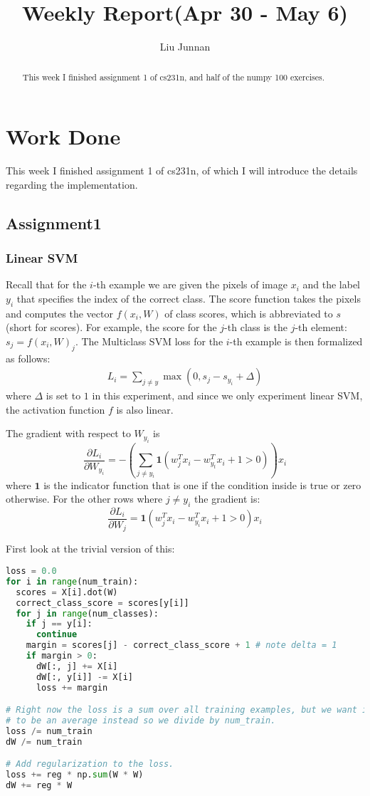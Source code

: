 \documentclass{article} %
\title{Weekly Report(Apr 30 - May 6)}
\author{
Liu Junnan
}
\begin{document}
\maketitle

\begin{abstract}
This week I finished assignment 1 of cs231n, and half of the numpy 100 exercises.
\end{abstract}

\section{Work Done}
This week I finished assignment 1 of cs231n, of which I will introduce the details regarding the implementation.

\subsection{Assignment1}
\subsubsection{Linear SVM}
Recall that for the $i$-th example we are given the pixels of image $x_i$ and the label $y_i$ that specifies the index of the correct class. The score function takes the pixels and computes the vector $f(x_i,W)$ of class scores, which is abbreviated to $s$ (short for scores). For example, the score for the $j$-th class is the $j$-th element: $s_j=f(x_i,W)_j$. The Multiclass SVM loss for the $i$-th example is then formalized as follows:
\begin{eqnarray}
L_i=\sum_{j \ne y} \max(0,s_j - s_{y_i} + \Delta)
\label{eqn:svm-loss}
\end{eqnarray}
where $\Delta$ is set to $1$ in this experiment, and since we only experiment linear SVM, the activation function $f$ is also linear.

The gradient with respect to $W_{y_i}$ is
$$\frac{\partial L_i}{\partial W_{y_i}}= -\left(\sum_{j \ne y_i} \mathbf{1}(w_j^T x_i - w_{y_t}^T x_i + 1 > 0)\right)x_i $$
where $\mathbf{1}$ is the indicator function that is one if the condition inside is true or zero otherwise. For the other rows where $j \ne y_i$ the gradient is:
$$\frac{\partial L_i}{\partial W_j} = \mathbf{1}(w_j^T x_i - w_{y_i}^T x_i + 1 > 0)x_i$$

First look at the trivial version of this:
\begin{lstlisting}[language=python]
loss = 0.0
for i in range(num_train):
  scores = X[i].dot(W)
  correct_class_score = scores[y[i]]
  for j in range(num_classes):
    if j == y[i]:
      continue
    margin = scores[j] - correct_class_score + 1 # note delta = 1
    if margin > 0:
      dW[:, j] += X[i]
      dW[:, y[i]] -= X[i]
      loss += margin

# Right now the loss is a sum over all training examples, but we want it
# to be an average instead so we divide by num_train.
loss /= num_train
dW /= num_train

# Add regularization to the loss.
loss += reg * np.sum(W * W)
dW += reg * W
\end{lstlisting}
\end{document}
